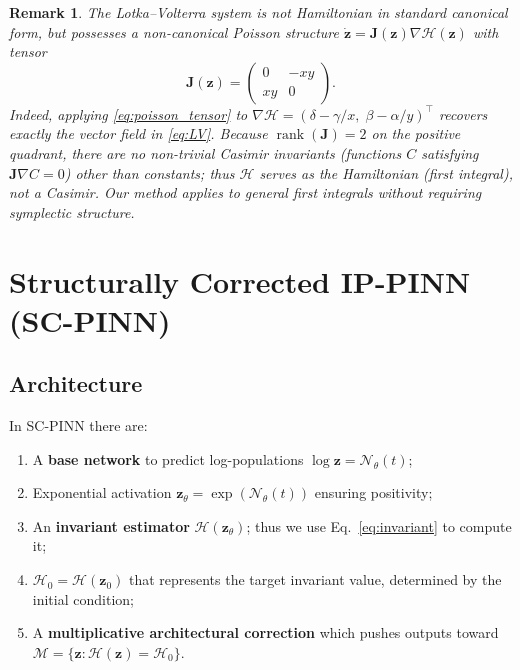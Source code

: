 \documentclass[pdflatex,sn-mathphys-num]{sn-jnl}
\theoremstyle{thmstyleone}%
\theoremstyle{thmstyletwo}%
\newtheorem{remark}{Remark}%
\theoremstyle{thmstylethree}%
\newcommand{\methodname}{SC-PINN}
\begin{document}
	\begin{remark}\label{rem:poisson}
		The Lotka--Volterra system is not Hamiltonian in standard canonical form, but possesses a non-canonical Poisson structure $\dot{\mathbf{z}} = \mathbf{J}(\mathbf{z}) \nabla \mathcal{H}(\mathbf{z})$ with tensor
		\begin{equation}
		\mathbf{J}(\mathbf{z}) = \begin{pmatrix} 0 & -xy \\ xy & 0 \end{pmatrix}.
		\label{eq:poisson_tensor}
		\end{equation}
		Indeed, applying \eqref{eq:poisson_tensor} to $\nabla \mathcal{H} = (\delta - \gamma/x,\; \beta - \alpha/y)^{\top}$ recovers exactly the vector field in \eqref{eq:LV}. Because $\operatorname{rank}(\mathbf{J}) = 2$ on the positive quadrant, there are no non-trivial Casimir invariants (functions $C$ satisfying $\mathbf{J}\nabla C = 0$) other than constants; thus $\mathcal{H}$ serves as the Hamiltonian (first integral), not a Casimir. Our method applies to general first integrals without requiring symplectic structure.
	\end{remark}
	
	\section{Structurally Corrected IP-PINN (SC-PINN)}\label{sec4}
	
	\subsection{Architecture}\label{subsec4.1}
	
	In \methodname{} there are:
	\begin{enumerate}
		\item A \textbf{base network} to predict log-populations $\log \mathbf{z} = \mathcal{N}_\theta(t)$;
		\item Exponential activation $\mathbf{z}_\theta = \exp(\mathcal{N}_\theta(t))$ ensuring positivity;
		\item An \textbf{invariant estimator} $\mathcal{H}(\mathbf{z}_\theta)$; thus we use Eq.~\eqref{eq:invariant} to compute it;
		\item $\mathcal{H}_0 = \mathcal{H}(\mathbf{z}_0)$ that represents the target invariant value, determined by the initial condition;
		\item A \textbf{multiplicative architectural correction} which pushes outputs toward $\mathcal{M} = \{\mathbf{z} : \mathcal{H}(\mathbf{z}) = \mathcal{H}_0\}$.
	\end{enumerate}
	
\end{document}
